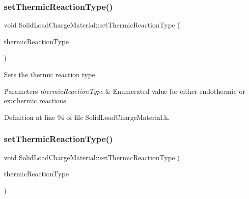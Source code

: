 \subsubsection{\texorpdfstring{set\+Thermic\+Reaction\+Type()}{setThermicReactionType()}\hspace{0.1cm}{\footnotesize\ttfamily [2/3]}}
{\footnotesize\ttfamily void Solid\+Load\+Charge\+Material\+::set\+Thermic\+Reaction\+Type (\begin{DoxyParamCaption}\item[{\hyperlink{namespace_load_charge_material_a51d4263e865a5d86236622dd3fe23fd1}{Load\+Charge\+Material\+::\+Thermic\+Reaction\+Type}}]{thermic\+Reaction\+Type }\end{DoxyParamCaption})\hspace{0.3cm}{\ttfamily [inline]}}

Sets the thermic reaction type 
\begin{DoxyParams}{Parameters}
{\em thermic\+Reaction\+Type} & Enumerated value for either endothermic or exothermic reactions \\
\hline
\end{DoxyParams}


Definition at line 94 of file Solid\+Load\+Charge\+Material.\+h.

\mbox{\label{class_solid_load_charge_material_ae2f85e0fbeff9f72b808bf86e645797f}} 
\subsubsection{\texorpdfstring{set\+Thermic\+Reaction\+Type()}{setThermicReactionType()}\hspace{0.1cm}{\footnotesize\ttfamily [3/3]}}
{\footnotesize\ttfamily void Solid\+Load\+Charge\+Material\+::set\+Thermic\+Reaction\+Type (\begin{DoxyParamCaption}\item[{\hyperlink{namespace_load_charge_material_a51d4263e865a5d86236622dd3fe23fd1}{Load\+Charge\+Material\+::\+Thermic\+Reaction\+Type}}]{thermic\+Reaction\+Type }\end{DoxyParamCaption})\hspace{0.3cm}{\ttfamily [inline]}}


